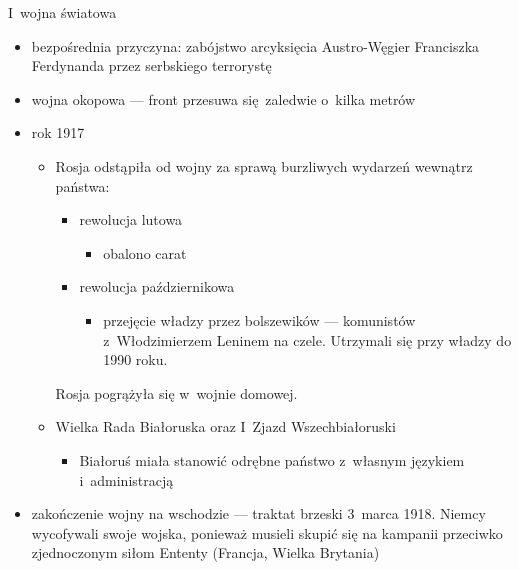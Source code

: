 \begin{description}
    \item I~wojna światowa
        \begin{itemize}
            \item bezpośrednia przyczyna: zabójstwo arcyksięcia Austro-Węgier Franciszka Ferdynanda przez serbskiego terrorystę
            \item wojna okopowa --- front przesuwa się zaledwie o~kilka metrów
            \item rok 1917
                \begin{itemize}
                    \item Rosja odstąpiła od wojny za sprawą burzliwych wydarzeń wewnątrz państwa:
                        \begin{itemize}
                            \item rewolucja lutowa
                                \begin{itemize}
                                    \item obalono carat
                                \end{itemize}
                            \item rewolucja październikowa
                                \begin{itemize}
                                    \item przejęcie władzy przez bolszewików --- komunistów z~Włodzimierzem Leninem na czele. Utrzymali się przy władzy do 1990 roku.
                                \end{itemize}
                        \end{itemize}
                        Rosja pogrążyła się w~wojnie domowej.
                    \item Wielka Rada Białoruska oraz I~Zjazd Wszechbiałoruski
                        \begin{itemize}
                            \item Białoruś miała stanowić odrębne państwo z~własnym językiem i~administracją
                        \end{itemize}
                \end{itemize}
            \item zakończenie wojny na wschodzie --- traktat brzeski 3~marca 1918. Niemcy wycofywali swoje wojska, ponieważ musieli skupić się na kampanii przeciwko zjednoczonym siłom Ententy (Francja, Wielka Brytania)
        \end{itemize}
\end{description}
